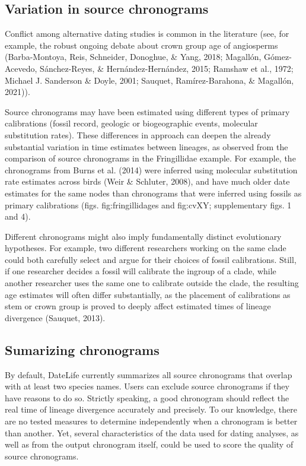 \documentclass[
  english,
  man]{apa6}
\begin{document}
\hypertarget{variation-in-source-chronograms}{%
\subsection{Variation in source chronograms}\label{variation-in-source-chronograms}}

Conflict among alternative dating studies is common in the literature
(see, for example, the robust ongoing debate about crown group age of angiosperms (Barba-Montoya, Reis, Schneider, Donoghue, \& Yang, 2018; Magallón, Gómez-Acevedo, Sánchez-Reyes, \& Hernández-Hernández, 2015; Ramshaw et al., 1972; Michael J. Sanderson \& Doyle, 2001; Sauquet, Ramírez-Barahona, \& Magallón, 2021)).

Source chronograms may have been estimated using different types of primary calibrations (fossil record, geologic or biogeographic events, molecular substitution rates).
These differences in approach can deepen the already substantial variation in time estimates between lineages, as observed from the comparison of source chronograms in the Fringillidae example.
For example, the chronograms from Burns et al. (2014) were inferred using molecular substitution rate estimates across birds (Weir \& Schluter, 2008), and have much older date estimates for the same nodes than chronograms that were inferred using fossils as primary calibrations (figs. fig:fringillidages and fig:cvXY; supplementary figs. 1 and 4).

Different chronograms might also imply fundamentally distinct evolutionary hypotheses.
For example, two different researchers working on the same clade could both carefully select and argue for their choices of fossil calibrations.
Still, if one researcher decides a fossil will calibrate the ingroup of a clade, while another researcher uses the same one to calibrate outside the clade, the resulting age estimates will often differ substantially, as the placement of calibrations as stem or crown group is proved to deeply affect estimated times of lineage divergence (Sauquet, 2013).

\hypertarget{sumarizing-chronograms}{%
\subsection{Sumarizing chronograms}\label{sumarizing-chronograms}}

By default, DateLife currently summarizes all source chronograms that overlap with at least two species names. Users can exclude source chronograms if they have reasons to do so.
Strictly speaking, a good chronogram should reflect the real time of lineage divergence accurately and precisely.
To our knowledge, there are no tested measures to determine independently when a chronogram is better than another. Yet, several characteristics of the data used for dating analyses, as well as from the output chronogram itself, could be used to score the quality of source chronograms.
\end{document}
